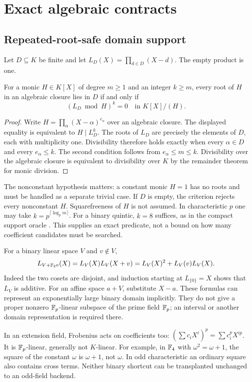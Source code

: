 \section{Exact algebraic contracts}
\subsection{Repeated-root-safe domain support}
Let $D\subseteq K$ be finite and let
$L_D(X)=\prod_{d\in D}(X-d)$. The empty product is one.

\begin{theorem}\label{thm:support}
For a monic $H\in K[X]$ of degree $m\geq1$ and an integer $k\geq m$,
every root of $H$ in an algebraic closure lies in $D$ if and only if
\[
          (L_D\bmod H)^k=0\quad\text{in }K[X]/(H).
\]
\end{theorem}
\begin{proof}
Write $H=\prod_\alpha(X-\alpha)^{e_\alpha}$ over an algebraic closure.
The displayed equality is equivalent to $H\mid L_D^k$. The roots of $L_D$
are precisely the elements of $D$, each with multiplicity one. Divisibility
therefore holds exactly when every $\alpha\in D$ and every $e_\alpha\leq k$.
The second condition follows from $e_\alpha\leq m\leq k$.
Divisibility over the algebraic closure is equivalent to divisibility over
$K$ by the remainder theorem for monic division.
\end{proof}

The nonconstant hypothesis matters: a constant monic $H=1$ has no roots and
must be handled as a separate trivial case. If $D$ is empty, the criterion
rejects every nonconstant $H$. Squarefreeness of $H$ is not assumed.
In characteristic $p$ one may take $k=p^{\lceil\log_p m\rceil}$.
For a binary quintic, $k=8$ suffices, as in the compact support oracle .
This supplies an exact predicate, not a bound on how many coefficient
candidates must be searched.

For a binary linear space $V$ and $v\notin V$,
\[
 L_{V+\mathbb F_2v}(X)=L_V(X)L_V(X+v)
              =L_V(X)^2+L_V(v)L_V(X).
\]
Indeed the two cosets are disjoint, and induction starting at $L_{\{0\}}=X$
shows that $L_V$ is additive. For an affine space $a+V$, substitute $X-a$.
These formulas can represent an exponentially large binary domain implicitly.
They do not give a proper nonzero $\mathbb F_p$-linear subspace of the prime field
$\mathbb F_p$; an interval or another domain representation is required there.

In an extension field, Frobenius acts on coefficients too:
$(\sum c_iX^i)^p=\sum c_i^pX^{ip}$. It is $\mathbb F_p$-linear, generally not
$K$-linear. For example, in $\mathbb F_4$ with $\omega^2=\omega+1$,
the square of the constant $\omega$ is $\omega+1$, not $\omega$.
In odd characteristic an ordinary square also contains cross terms.
Neither binary shortcut can be transplanted unchanged to an odd-field backend.

